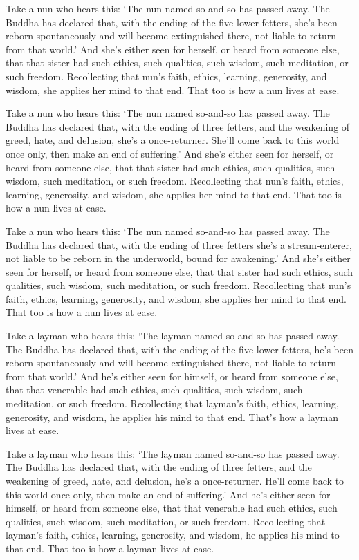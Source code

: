 \documentclass[12pt,openany]{book}%
\begin{document}
Take a nun who hears this: ‘The nun named so-and-so has passed away. The Buddha has declared that, with the ending of the five lower fetters, she’s been reborn spontaneously and will become extinguished there, not liable to return from that world.’ And she’s either seen for herself, or heard from someone else, that that sister had such ethics, such qualities, such wisdom, such meditation, or such freedom. Recollecting that nun’s faith, ethics, learning, generosity, and wisdom, she applies her mind to that end. That too is how a nun lives at ease. 

Take a nun who hears this: ‘The nun named so-and-so has passed away. The Buddha has declared that, with the ending of three fetters, and the weakening of greed, hate, and delusion, she’s a once-returner. She’ll come back to this world once only, then make an end of suffering.’ And she’s either seen for herself, or heard from someone else, that that sister had such ethics, such qualities, such wisdom, such meditation, or such freedom. Recollecting that nun’s faith, ethics, learning, generosity, and wisdom, she applies her mind to that end. That too is how a nun lives at ease. 

Take a nun who hears this: ‘The nun named so-and-so has passed away. The Buddha has declared that, with the ending of three fetters she’s a stream-enterer, not liable to be reborn in the underworld, bound for awakening.’ And she’s either seen for herself, or heard from someone else, that that sister had such ethics, such qualities, such wisdom, such meditation, or such freedom. Recollecting that nun’s faith, ethics, learning, generosity, and wisdom, she applies her mind to that end. That too is how a nun lives at ease. 

Take a layman who hears this: ‘The layman named so-and-so has passed away. The Buddha has declared that, with the ending of the five lower fetters, he’s been reborn spontaneously and will become extinguished there, not liable to return from that world.’ And he’s either seen for himself, or heard from someone else, that that venerable had such ethics, such qualities, such wisdom, such meditation, or such freedom. Recollecting that layman’s faith, ethics, learning, generosity, and wisdom, he applies his mind to that end. That’s how a layman lives at ease. 

Take a layman who hears this: ‘The layman named so-and-so has passed away. The Buddha has declared that, with the ending of three fetters, and the weakening of greed, hate, and delusion, he’s a once-returner. He’ll come back to this world once only, then make an end of suffering.’ And he’s either seen for himself, or heard from someone else, that that venerable had such ethics, such qualities, such wisdom, such meditation, or such freedom. Recollecting that layman’s faith, ethics, learning, generosity, and wisdom, he applies his mind to that end. That too is how a layman lives at ease. 
\end{document}
